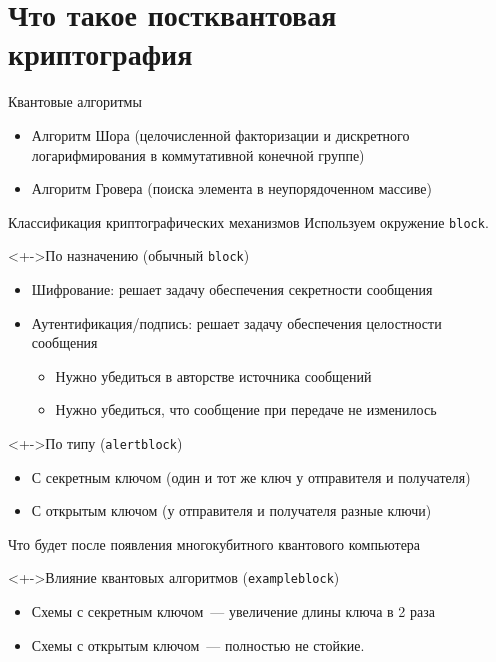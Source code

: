 \documentclass[aspectratio=169, 12pt]{beamer}
\begin{document}
\section{Что такое постквантовая криптография}
\label{sec:orgf104826}
\begin{frame}[label={sec:orgd146981}]{Квантовые алгоритмы}
    \begin{itemize}[<+->]
        \item Алгоритм Шора (целочисленной факторизации и дискретного логарифмирования в коммутативной конечной группе)
        \item Алгоритм Гровера (поиска элемента в неупорядоченном массиве)
    \end{itemize}
\end{frame}
\begin{frame}[label={sec:orgdebe1b9},fragile]{Классификация криптографических механизмов}
    Используем окружение \texttt{block}.
    \begin{block}<+->{По назначению (обычный \texttt{block})}
        \begin{itemize}[<+->]
            \item Шифрование: решает задачу обеспечения секретности сообщения
            \item Аутентификация/подпись: решает задачу обеспечения целостности сообщения
                  \begin{itemize}
                      \item Нужно убедиться в авторстве источника сообщений
                      \item Нужно убедиться, что сообщение при передаче не изменилось
                  \end{itemize}
        \end{itemize}
    \end{block}
    \begin{alertblock}<+->{По типу (\texttt{alertblock})}
        \begin{itemize}[<+->]
            \item С секретным ключом (один и тот же ключ у отправителя и получателя)
            \item С открытым ключом (у отправителя и получателя \alert{разные} ключи)
        \end{itemize}
    \end{alertblock}
\end{frame}
\begin{frame}[label={sec:org320a5ac},fragile]{Что будет после появления многокубитного квантового компьютера}
    \begin{exampleblock}<+->{Влияние квантовых алгоритмов (\texttt{exampleblock})}\label{sec:org838f96c}
        \begin{itemize}[<+->]
            \item Схемы с секретным ключом~--- увеличение длины ключа в 2 раза
            \item \alert{Схемы с открытым ключом}~--- полностью не стойкие.
        \end{itemize}
    \end{exampleblock}
\end{frame}
\end{document}
